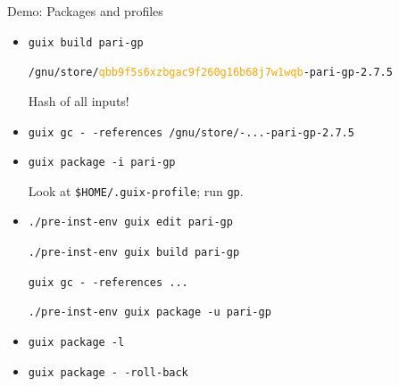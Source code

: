 \documentclass [t]{beamer}
\begin{document}
\begin{frame}[fragile]{Demo: Packages and profiles}
\small
\begin {itemize}
\item
\texttt {guix build pari-gp}

\texttt {/gnu/store/\textcolor {orange}{qbb9f5s6xzbgac9f260g16b68j7w1wqb}-pari-gp-2.7.5}

Hash of all inputs!

\pause
\item
\texttt {guix gc -\,-references /gnu/store/-...-pari-gp-2.7.5}

\pause
\item
\texttt {guix package -i pari-gp}

Look at \texttt {\$HOME/.guix-profile}; run \texttt {gp}.

\pause
\item
\texttt {./pre-inst-env guix edit pari-gp}

\texttt {./pre-inst-env guix build pari-gp}

\texttt {guix gc -\,-references ...}

\texttt {./pre-inst-env guix package -u pari-gp}

\pause
\item
\texttt {guix package -l}

\pause
\item
\textcolor {gruen}{\texttt {guix package -\,-roll-back}}
\end {itemize}
\end{frame}
\end{document}
